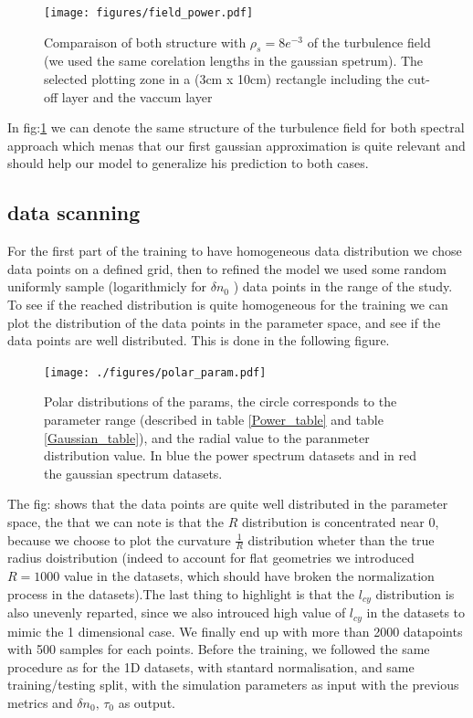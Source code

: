 \documentclass[11pt,a4paper,openany]{report}
\begin{document}
\begin{multicols}{2}
    \begin{figure}[H]
        \centering
        \texttt{[image: figures/field\_power.pdf]}
        \caption{Comparaison of both structure with $\rho_s = 8e^{-3}$ of the turbulence field (we used the same corelation lengths in the gaussian spetrum). The selected plotting zone in a (3cm x 10cm) rectangle including the cut-off layer and the vaccum layer}

        \label{fig:density_field}
    \end{figure}

    In  fig:\ref{fig:density_field} we can denote the same structure of the turbulence field for both spectral approach which menas that our first gaussian approximation is quite relevant and should help our model to generalize his prediction to both cases.
    \subsection{data scanning}
    For the first part of the training to have homogeneous data distribution we chose data points on a defined grid, then to refined the model we used some random uniformly sample (logarithmicly for $\delta n_0$ ) data points in the range of the study. To see if the reached distribution is quite homogeneous for the training we can plot the distribution of the data points in the parameter space, and see if the data points are well distributed. This is done in the following figure.

    \begin{figure}[H]
        \centering
        \texttt{[image: ./figures/polar\_param.pdf]}
        \caption{Polar distributions of the params, the circle corresponds to the parameter range (described in table \ref{Power_table} and table \ref{Gaussian_table}), and the radial value to the paranmeter distribution value. In blue the power spectrum datasets and in red the gaussian spectrum datasets.}
        \label{params_distr}
    \end{figure}

    The fig: shows that the data points are quite well distributed in the parameter space, the that we can note is that the $R$ distribution is concentrated near 0, because we choose to plot the curvature $\frac{1}{R}$  distribution wheter than the true radius doistribution (indeed to account for flat geometries we introduced $R = 1000$ value in the datasets, which should have broken the normalization process in the datasets).The last thing to highlight is that the $l_{cy}$ distribution is also unevenly reparted, since we also introuced high value of $l_{cy}$ in the datasets to mimic the 1 dimensional case. We finally end up with more than 2000 datapoints with 500 samples for each points. Before the training, we followed the same procedure as for the 1D datasets, with stantard normalisation, and same training/testing split, with the simulation parameters as input with the previous metrics and $\delta n_0, \, \tau_0$ as output.


\end{multicols}
\end{document}
